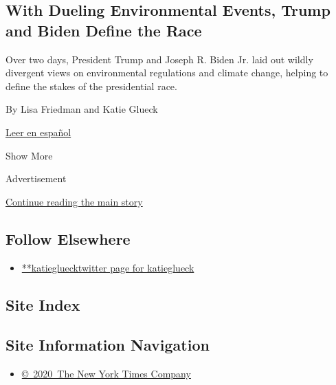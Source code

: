 \begin{enumerate}
  \hypertarget{with-dueling-environmental-events-trump-and-biden-define-the-race}{%
  \subsection{With Dueling Environmental Events, Trump and Biden Define
  the
  Race}\label{with-dueling-environmental-events-trump-and-biden-define-the-race}}

  Over two days, President Trump and Joseph R. Biden Jr. laid out wildly
  divergent views on environmental regulations and climate change,
  helping to define the stakes of the presidential race.

  By Lisa Friedman and Katie Glueck

  \href{https://www.nytimes.com/es/2020/07/17/espanol/estados-unidos/cambio-climatico-trump-biden.html}{Leer
  en español}
\end{enumerate}

Show More

Advertisement

\protect\hyperlink{after-mid2}{Continue reading the main story}

\hypertarget{follow-elsewhere}{%
\subsection{Follow Elsewhere}\label{follow-elsewhere}}

\begin{itemize}
\tightlist
\item
  \href{https://twitter.com/katieglueck}{**katiegluecktwitter page for
  katieglueck}
\end{itemize}

\hypertarget{site-index}{%
\subsection{Site Index}\label{site-index}}

\hypertarget{site-information-navigation}{%
\subsection{Site Information
Navigation}\label{site-information-navigation}}

\begin{itemize}
\tightlist
\item
  \href{https://help.nytimes.com/hc/en-us/articles/115014792127-Copyright-notice}{©~2020~The
  New York Times Company}
\end{itemize}

